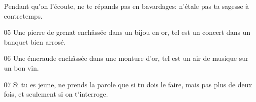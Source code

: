 
Pendant qu’on l’écoute, ne te répands pas en bavardages: n’étale pas ta sagesse à contretemps.

05 Une pierre de grenat enchâssée dans un bijou en or, tel est un concert dans un banquet bien arrosé.

06 Une émeraude enchâssée dans une monture d’or, tel est un air de musique sur un bon vin.

07 Si tu es jeune, ne prends la parole que si tu dois le faire, mais pas plus de deux fois, et seulement si on t’interroge.
